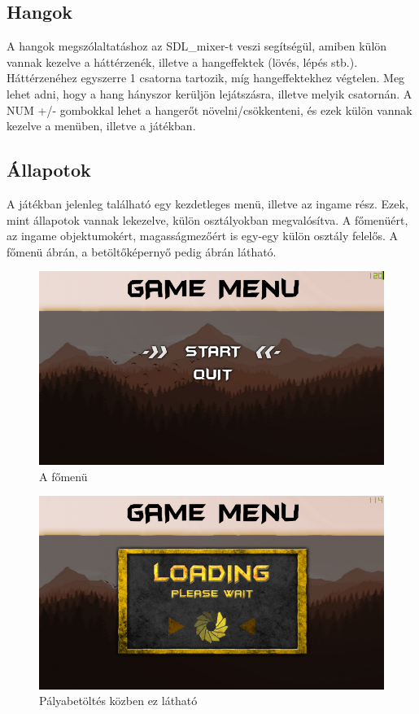 \subsection{Hangok}

A hangok megszólaltatáshoz az SDL\_mixer-t veszi segítségül, amiben külön vannak kezelve a háttérzenék, illetve a hangeffektek (lövés, lépés stb.). Háttérzenéhez egyszerre 1 csatorna tartozik, míg hangeffektekhez végtelen. Meg lehet adni, hogy a hang hányszor kerüljön lejátszásra, illetve melyik csatornán. A  NUM +/- gombokkal lehet a hangerőt növelni/csökkenteni, és ezek külön vannak kezelve a menüben, illetve a játékban.

\subsection{Állapotok}

A játékban jelenleg található egy kezdetleges menü, illetve az ingame rész. Ezek, mint állapotok vannak lekezelve, külön osztályokban megvalósítva. A főmenüért, az ingame objektumokért, magasságmezőért is egy-egy külön osztály felelős. A főmenü  ábrán, a betöltőképernyő pedig  ábrán látható.

\begin{figure}[h]
\centering
\includegraphics[scale=1.6]{kepek/menu.png}
\caption{A főmenü}
\label{fig:menu}
\end{figure}

\begin{figure}[h]
\centering
\includegraphics[scale=1.6]{kepek/loading_screen.png}
\caption{Pályabetöltés közben ez látható}
\label{fig:loading}
\end{figure}

